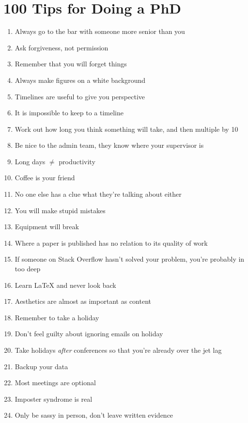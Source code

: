 %
%

\chapter{100 Tips for Doing a PhD}
\label{app:app01}

\begin{enumerate}
	\item Always go to the bar with someone more senior than you
	\item Ask forgiveness, not permission
	\item Remember that you will forget things
	\item Always make figures on a white background
	\item Timelines are useful to give you perspective
	\item It is impossible to keep to a timeline
	\item Work out how long you think something will take, and then multiple by 10 \cite{Hofstadter}
	\item Be nice to the admin team, they know where your supervisor is
	\item Long days $\ne$ productivity
	\item Coffee is your friend
	\item No one else has a clue what they're talking about either
	\item You will make stupid mistakes
	\item Equipment will break
	\item Where a paper is published has no relation to its quality of work 
	\item If someone on Stack Overflow hasn't solved your problem, you're probably in too deep
	\item Learn \LaTeX{} and never look back
	\item Aesthetics are almost as important as content
	\item Remember to take a holiday
	\item Don't feel guilty about ignoring emails on holiday
	\item Take holidays \textit{after} conferences so that you're already over the jet lag
	\item Backup your data
	\item Most meetings are optional
	\item Imposter syndrome is real \cite{langford1993}
	\item Only be sassy in person, don't leave written evidence

\end{enumerate}
